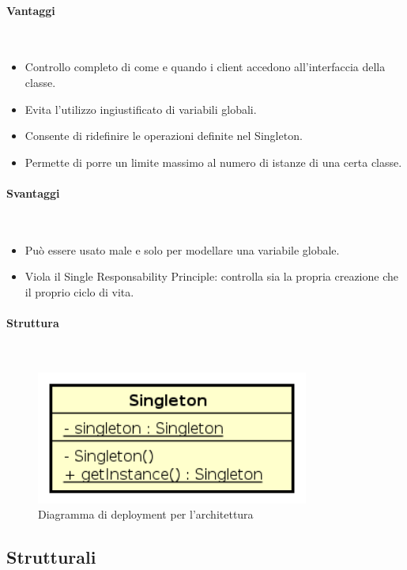 \paragraph{Vantaggi} \mbox{} \\
\begin{itemize}
\item Controllo completo di come e quando i client accedono all’interfaccia della classe.
\item Evita l’utilizzo ingiustificato di variabili globali.
\item Consente di ridefinire le operazioni definite nel Singleton.
\item Permette di porre un limite massimo al numero di istanze di una certa classe.
\end{itemize}
\paragraph{Svantaggi} \mbox{} \\
\begin{itemize}
\item Può essere usato male e solo per modellare una variabile globale.
\item Viola il Single Responsability Principle: controlla sia la propria creazione che il proprio ciclo di vita.
\end{itemize}
\paragraph{Struttura} \mbox{} \\
\begin{figure}[h]
\centering
\includegraphics[width=0.8\textwidth]{res/sections/backend/singleton.png}
\caption{Diagramma di deployment per l'architettura}
\end{figure}
\subsection{Strutturali}
